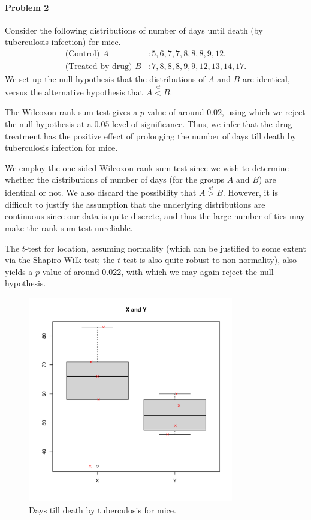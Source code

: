 \documentclass[10pt]{article}
\begin{document}
    \clearpage

    \paragraph{Problem 2} Consider the following distributions of number of
    days until death (by tuberculosis infection) for mice. \begin{align*}
        \text{(Control) } A &: 5, 6, 7, 7, 8, 8, 8, 9, 12. \\
        \text{(Treated by drug) } B &: 7, 8, 8, 8, 9, 9, 12, 13, 14, 17.
    \end{align*} We set up the null hypothesis that the distributions of $A$
    and $B$ are identical, versus the alternative hypothesis that $A
    \stackrel{st}{<} B$.

    The Wilcoxon rank-sum test gives a $p$-value of around $0.02$, using which
    we reject the null hypothesis at a $0.05$ level of significance. Thus, we
    infer that the drug treatment has the positive effect of prolonging the
    number of days till death by tuberculosis infection for mice.

    We employ the one-sided Wilcoxon rank-sum test since we wish to determine
    whether the distributions of number of days (for the groups $A$ and $B$)
    are identical or not. We also discard the possibility that $A
    \stackrel{st}{>} B$. However, it is difficult to justify the assumption
    that the underlying distributions are continuous since our data is quite
    discrete, and thus the large number of ties may make the rank-sum test
    unreliable.

    The $t$-test for location, assuming normality (which can be justified to
    some extent via the Shapiro-Wilk test; the $t$-test is also quite robust
    to non-normality), also yields a $p$-value of around $0.022$, with which
    we may again reject the null hypothesis.

    \begin{figure}[H]
        \centering
        \includegraphics[width=0.8\textwidth, page = 2]{final_plots.pdf}
        \vspace{-2em}
        \caption{Days till death by tuberculosis for mice.}
        \label{fig:tuberculosis_treatment}
    \end{figure}
\end{document}
